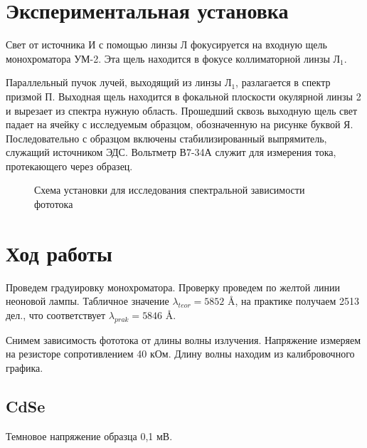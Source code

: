 \documentclass[a4paper,12pt]{article} %
\begin{document}
\section{Экспериментальная установка}

Свет от источника И с помощью линзы Л фокусируется на входную щель монохроматора УМ-2. Эта щель находится в фокусе коллиматорной линзы $\text{Л}_1$.

	Параллельный пучок лучей, выходящий из линзы $\text{Л}_1$, разлагается в спектр призмой П. Выходная щель находится в фокальной плоскости окулярной линзы 2 и вырезает из спектра нужную область. Прошедший сквозь выходную щель свет падает на ячейку с исследуемым образцом, обозначенную на рисунке буквой Я. Последовательно с образцом включены стабилизированный выпрямитель, служащий источником ЭДС. Вольтметр В7-34А служит для измерения тока, протекающего через образец.

	\begin{figure}[ht!]
	\caption{Схема установки для исследования спектральной зависимости фототока}
	\label{pic:scheme}
	\end{figure}
	
\section{Ход работы}
Проведем градуировку монохроматора. Проверку проведем по желтой линии неоновой лампы. Табличное значение $\lambda_{teor} = 5852\text{ \AA}$, на практике получаем 2513 дел., что соответствует $\lambda_{prak} = 5846\text{ \AA} .$ 

Снимем зависимость фототока от длины волны излучения. Напряжение измеряем на резисторе сопротивлением 40 кОм. Длину волны находим из калибровочного графика.

\subsection{CdSe}
Темновое напряжение образца 0,1 мВ.
\end{document}

